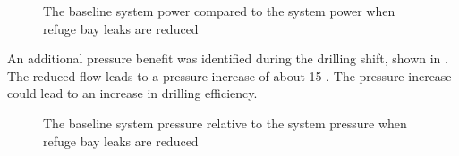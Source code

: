 	\par
	\begin{figure}[h!]
		\centering
		
		\caption{The baseline system power compared to the system power when refuge bay leaks are reduced}
		\label{fig: RefugeBay Power.}
	\end{figure} 
	An additional pressure benefit was identified during the drilling shift, shown in . The reduced flow leads to a pressure increase of about 15 . The pressure increase could lead to an increase in drilling efficiency.
	\begin{figure}[h!]
		\centering
		
		\caption{The baseline system pressure relative to the system pressure when refuge bay leaks are reduced}
		\label{fig: RefugeBay Pressures.}
	\end{figure} 

